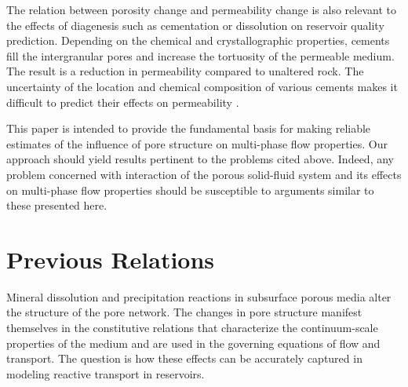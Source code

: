 \documentclass[preprint,12pt,authoryear]{elsarticle}
\begin{document}
The relation between porosity change and permeability change is also relevant to the effects of diagenesis such as cementation or dissolution on reservoir quality prediction. Depending on the chemical and crystallographic properties, cements fill the intergranular pores and increase the tortuosity of the permeable medium. The result is a reduction in permeability compared to unaltered rock. The uncertainty of the location and chemical composition of various cements makes it difficult to predict their effects on permeability \citep{panda1995physical,bjorkum1998temperature}.

This paper is intended to provide the fundamental basis for making reliable estimates of the influence of pore structure on multi-phase flow properties. Our approach should yield results pertinent to the problems cited above. Indeed, any problem concerned with interaction of the porous solid-fluid system and its effects on multi-phase flow properties should be susceptible to arguments similar to these presented here.

\section{Previous Relations}
\label{S:2}

Mineral dissolution and precipitation reactions in subsurface porous media alter the structure of the pore network. The changes in pore structure manifest themselves in the constitutive relations that characterize the continuum-scale properties of the medium and are used in the governing equations of flow and transport. The question is how these effects can be accurately captured in modeling reactive transport in reservoirs. %
\end{document}
